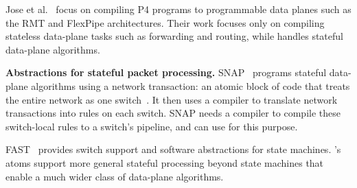 Jose et al.~\cite{lavanya_compiler} focus on compiling P4 programs to
programmable data planes such as the RMT and FlexPipe architectures. Their work
focuses only on compiling stateless data-plane tasks such as forwarding and
routing, while \pktlanguage handles stateful data-plane algorithms.

\medskip
\noindent
\textbf{Abstractions for stateful packet processing.}
SNAP~\cite{snap} programs stateful data-plane algorithms using a network
transaction: an atomic block of code that treats the entire network as one
switch~\cite{onebigswitch}. It then uses a compiler to translate network
transactions into rules on each switch. SNAP needs a compiler to compile
these switch-local rules to a switch's pipeline, and can use \pktlanguage for
this purpose.

FAST~\cite{fast} provides switch
support and software abstractions for state machines. \absmachine's atoms
support more general stateful processing beyond state machines that enable a
much wider class of data-plane algorithms.
